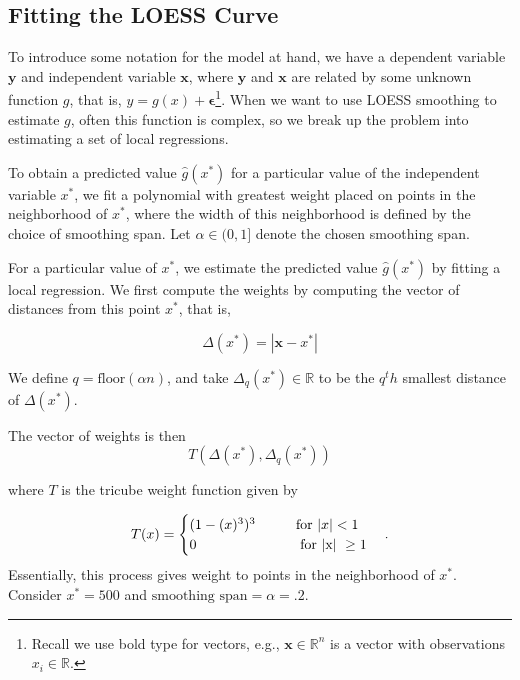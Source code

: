 \documentclass[12pt,twoside]{smiththesis}
\begin{document}
\hypertarget{fitting-the-loess-curve}{%
\subsection{Fitting the LOESS Curve}\label{fitting-the-loess-curve}}

To introduce some notation for the model at hand, we have a dependent variable \(\mathbf y\) and independent variable \(\mathbf x\), where \(\mathbf y\) and \(\mathbf x\) are related by some unknown function \(g\), that is, \(y = g(x) + \boldsymbol \epsilon\)\footnote{Recall we use bold type for vectors, e.g., \(\mathbf x \in \mathbb R^n\) is a vector with observations \(x_i \in \mathbb R\).}. When we want to use LOESS smoothing to estimate \(g\), often this function is complex, so we break up the problem into estimating a set of local regressions.

To obtain a predicted value \(\hat g(x^*)\) for a particular value of the independent variable \(x^*\), we fit a polynomial with greatest weight placed on points in the neighborhood of \(x^*\), where the width of this neighborhood is defined by the choice of smoothing span. Let \(\alpha \in (0,1]\) denote the chosen smoothing span.

For a particular value of \(x^*\), we estimate the predicted value \(\hat g(x^*)\) by fitting a local regression. We first compute the weights by computing the vector of distances from this point \(x^*\), that is,

\[\Delta (x^*) = |\mathbf x -x^* | \]

We define \(q = \text{floor}(\alpha n)\), and take \(\Delta_q(x^*) \in \mathbb R\) to be the \(q^th\) smallest distance of \(\Delta (x^*)\).

The vector of weights is then
\[T(\Delta(x^*), \Delta_q(x^*))\]

where \(T\) is the tricube weight function given by

\[
T(x) = \begin{cases} (1-(x)^3)^3 \hspace{9 mm}  \text{ for } |x| < 1\\
0  \hspace{25 mm} \text{ for |x| } \geq 1 \end{cases}.
\]
Essentially, this process gives weight to points in the neighborhood of \(x^*\). Consider \(x^* = 500\) and \(\text{smoothing span} = \alpha = .2\).
\end{document}
